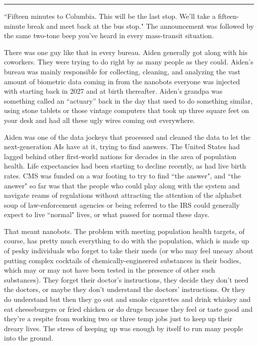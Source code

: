 \documentclass[11pt]{book}
\begin{document}
	\vspace{0.5cm}
	\hrule
	\vspace{0.5cm}
	
	``Fifteen minutes to Columbia. This will be the last stop. We'll take a fifteen-minute break and meet back at the bus stop." The announcement was followed by the same two-tone beep you've heard in every mass-transit situation.
	
	There was one guy like that in every bureau. Aiden generally got along with his coworkers. They were trying to do right by as many people as they could. Aiden's bureau was mainly responsible for collecting, cleaning, and analyzing the vast amount of biometric data coming in from the nanobots everyone was injected with starting back in 2027 and at birth thereafter. Aiden's grandpa was something called an ``actuary'' back in the day that used to do something similar, using stone tablets or those vintage computers that took up three square feet on your desk and had all these ugly wires coming out everywhere.
	
	Aiden was one of the data jockeys that processed and cleaned the data to let the next-generation AIs have at it, trying to find answers. The United States had lagged behind other first-world nations for decades in the area of population health. Life expectancies had been starting to decline recently, as had live birth rates. CMS was funded on a war footing to try to find ``the answer", and ``the answer" so far was that the people who could play along with the system and navigate reams of regulations without attracting the attention of the alphabet soup of law-enforcement agencies or being referred to the IRS could generally expect to live ``normal" lives, or what passed for normal these days.
	
	That meant nanobots. The problem with meeting population health targets, of course, has pretty much everything to do with the population, which is made up of pesky individuals who forget to take their meds (or who may feel uneasy about putting complex cocktails of  chemically-engineered substances in their bodies, which may or may not have been tested in the presence of other such substances). They forget their doctor's instructions, they decide they don't need the doctors, or maybe they don't understand the doctors' instructions. Or they do understand but then they go out and smoke cigarettes and drink whiskey and eat cheeseburgers or fried chicken or do drugs because they feel or taste good and they're a respite from working two or three temp jobs just to keep up their dreary lives. The stress of keeping up was enough by itself to run many people into the ground.
	
\end{document}
